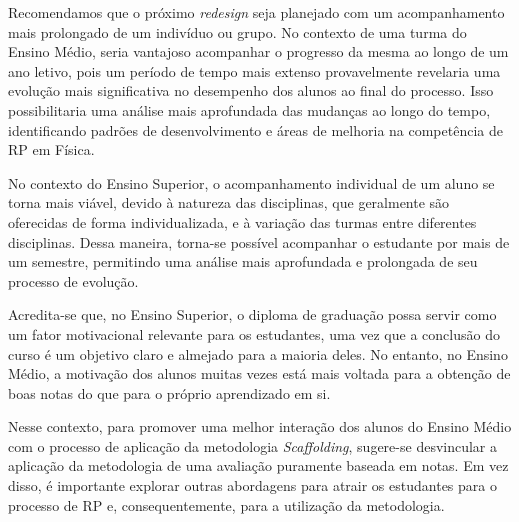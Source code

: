 Recomendamos que o próximo \textit{redesign} seja planejado com um acompanhamento mais prolongado de um indivíduo ou grupo. No contexto de uma turma do Ensino Médio, seria vantajoso acompanhar o progresso da mesma ao longo de um ano letivo, pois um período de tempo mais extenso provavelmente revelaria uma evolução mais significativa no desempenho dos alunos ao final do processo. Isso possibilitaria uma análise mais aprofundada das mudanças ao longo do tempo, identificando padrões de desenvolvimento e áreas de melhoria na competência de RP em Física.

No contexto do Ensino Superior, o acompanhamento individual de um aluno se torna mais viável, devido à natureza das disciplinas, que geralmente são oferecidas de forma individualizada, e à variação das turmas entre diferentes disciplinas. Dessa maneira, torna-se possível acompanhar o estudante por mais de um semestre, permitindo uma análise mais aprofundada e prolongada de seu processo de evolução.

Acredita-se que, no Ensino Superior, o diploma de graduação possa servir como um fator motivacional relevante para os estudantes, uma vez que a conclusão do curso é um objetivo claro e almejado para a maioria deles. No entanto, no Ensino Médio, a motivação dos alunos muitas vezes está mais voltada para a obtenção de boas notas do que para o próprio aprendizado em si. 

Nesse contexto, para promover uma melhor interação dos alunos do Ensino Médio com o processo de aplicação da metodologia \textit{Scaffolding}, sugere-se desvincular a aplicação da metodologia de uma avaliação puramente baseada em notas. Em vez disso, é importante explorar outras abordagens para atrair os estudantes para o processo de RP e, consequentemente, para a utilização da metodologia.